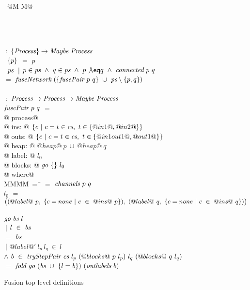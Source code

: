\begin{figure}

\begin{tabbing}
~@M M@   \TABDEF \kill

 \\
 \\
\\
 \> $~:$ \> $\{ \textit{Process} \} \to  \textit{Maybe}~\textit{Process}$ \\
~$\{ p \}$ \> $=$ \> $p$ \\
~$\textit{ps}$
    \> $~|$      \> $p \in \ti{ps} ~\wedge~ q \in \ti{ps} ~\wedge~ p \not\eq q ~\wedge~ \ti{connected}~p~q$ \\
    \> $=$ \> $\textit{fuseNetwork}~(\{ \textit{fusePair}~p~q \}~\cup~\textit{ps} \setminus \{ p,q \})$ \\
\\
 \> $~:$ \> $\textit{Process} \to \textit{Process} \to  \textit{Maybe}~\textit{Process}$ \\
$\textit{fusePair}~p~q$ \> $=$ \\
@    process@ \\
@        ins: @ $\{ c~|~c=t \in \textit{cs},~t \in \{ @in1@,@in2@ \} \} $ \\
@       outs: @ $\{ c~|~c=t \in \textit{cs},~t \in \{ @in1out1@,@out1@ \} \} $ \\
@       heap: @ $@heap@~p~\cup~@heap@~q$ \\
@      label: @ $l_0$ \\
@     blocks: @ $\textit{go}~\{  \}~l_0$ \\
@ where@ \\
MM\=MM\=~=~\=\kill
 \> \cs \> $=$ \> $\textit{channels}~p~q$ \\
 \> $l_0$   \> $=$ \> $
      \big( 
      (@label@~p,~\{ c=none~|~c~\in~@ins@~p \}),~
      (@label@~q,~\{ c=none~|~c~\in~@ins@~q \})
      \big)$ \\
 \\
 \> $\textit{go}~\textit{bs}~l$ \\
 \> \> $~|$ \> $l~\in~\textit{bs}$ \\
 \> \> $=$  \> $\textit{bs}$ \\
 \> \> $~|$     \> $@label@'~l_p~l_q~\in~l$ \\
 \> \> $\wedge$ \>
        $b~\in~\textit{tryStepPair}~\textit{cs}~l_p~(@blocks@~p~l_p)~l_q~(@blocks@~q~l_q)$ \\ 
 \> \> $=$ \> $\textit{fold}~\textit{go}~(\textit{bs}~\cup~\{ l=b \})~(\textit{outlabels}~b)$ \\
\end{tabbing}
\caption{Fusion top-level definitions}
\label{fig:Fusion:Def:Top}
\end{figure}


